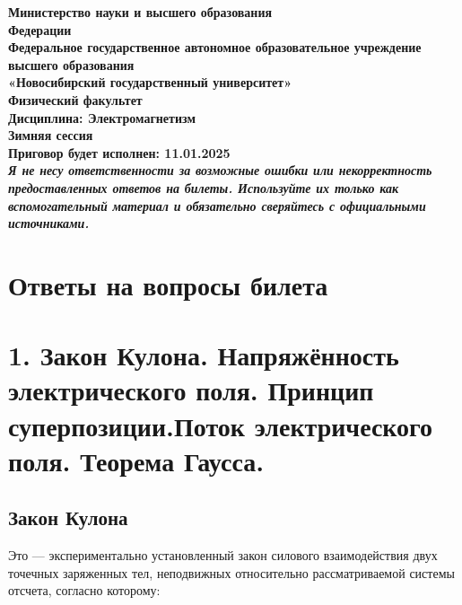 \documentclass[a4paper,12pt]{article}
\newcommand{\kr}[1]{\textit{#1}}
\begin{document}
\begin{titlepage}
    \begin{center}
        \textbf{\large Министерство науки и высшего образования}\\
        \textbf{ Федерации} \\
        \textbf{\large Федеральное государственное автономное образовательное
учреждение высшего образования} \\
        \textbf{\large «Новосибирский государственный университет» } \\
        \vspace{1em}
        \textbf{\large Физический факультет} \\
        \vspace{5em}
        \textbf{\Large Дисциплина: Электромагнетизм} \\
        \vspace{2em}
        \textbf{\Large Зимняя сессия } \\
        \vspace{25em}
        \textbf{\large Приговор будет исполнен: 11.01.2025}\\
        \vspace{1em}
        \textbf{\kr {Я не несу ответственности за возможные ошибки или некорректность предоставленных ответов на билеты. Используйте их только как вспомогательный материал и обязательно сверяйтесь с официальными источниками.}  }
    \end{center}
\end{titlepage}

\newpage

\section*{Ответы на вопросы билета}

\section*{1. Закон Кулона. Напряжённость электрического поля. Принцип
суперпозиции.Поток электрического поля. Теорема Гаусса.}

\subsection*{Закон Кулона}

Это — экспериментально установленный закон силового взаимодействия двух
точечных заряженных тел, неподвижных относительно рассматриваемой системы
отсчета, согласно которому:
\end{document}
